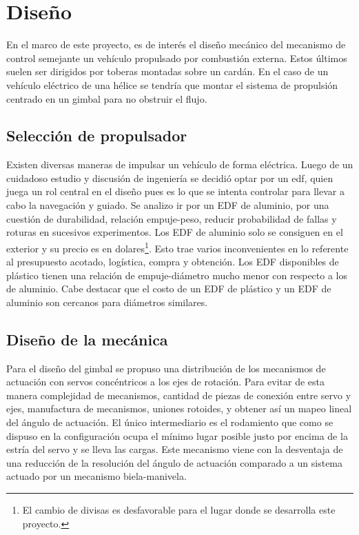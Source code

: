 \section{Diseño}

En el marco de este proyecto, es de interés el diseño mecánico del mecanismo de control semejante un vehículo propulsado por combustión externa. Estos últimos suelen ser dirigidos por toberas montadas sobre un cardán. En el caso de un vehículo eléctrico de una hélice se tendría que montar el sistema de propulsión centrado en un gimbal para no obstruir el flujo.

\subsection{Selección de propulsador}

Existen diversas maneras de impulsar un vehículo de forma eléctrica. Luego de un cuidadoso estudio y discusión de ingeniería se decidió optar por un \gls{edf}, quien juega un rol central en el diseño pues es lo que se intenta controlar para llevar a cabo la navegación y guiado. Se analizo
ir por un EDF de aluminio, por una cuestión de durabilidad, relación empuje-peso, reducir probabilidad de fallas y roturas en sucesivos experimentos. 
Los EDF de aluminio solo se consiguen en el exterior y su precio es en dolares\footnote{El cambio de divisas es desfavorable para el lugar donde se desarrolla este proyecto.}. Esto trae varios inconvenientes en lo referente al presupuesto acotado, logística, compra y obtención. Los EDF
disponibles de plástico tienen una relación de empuje-diámetro mucho menor con respecto a
los de aluminio. Cabe destacar que el costo de un EDF de plástico y un EDF de aluminio son cercanos para diámetros similares.


\subsection{Diseño de la mecánica}

Para el diseño del gimbal se propuso una distribución de los mecanismos de actuación con
servos concéntricos a los ejes de rotación. Para evitar de esta manera complejidad de
mecanismos, cantidad de piezas de conexión entre servo y ejes, manufactura de mecanismos,
uniones rotoides, y obtener así un mapeo lineal del ángulo de actuación. El único intermediario
es el rodamiento que como se dispuso en la configuración ocupa el mínimo lugar posible justo
por encima de la estría del servo y se lleva las cargas.
Este mecanismo viene con la desventaja de una reducción de la resolución del ángulo de actuación comparado a un sistema actuado por un mecanismo biela-manivela.

